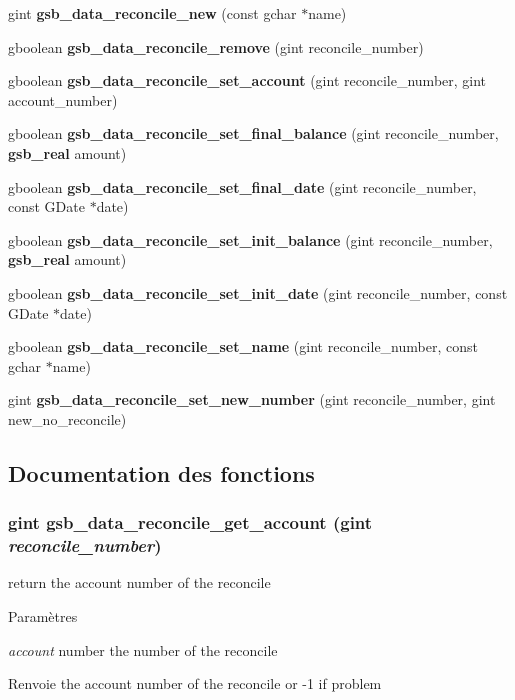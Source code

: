\begin{DoxyCompactItemize}
\item 
gint {\bf gsb\_\-data\_\-reconcile\_\-new} (const gchar $\ast$name)
\item 
gboolean {\bf gsb\_\-data\_\-reconcile\_\-remove} (gint reconcile\_\-number)
\item 
gboolean {\bf gsb\_\-data\_\-reconcile\_\-set\_\-account} (gint reconcile\_\-number, gint account\_\-number)
\item 
gboolean {\bf gsb\_\-data\_\-reconcile\_\-set\_\-final\_\-balance} (gint reconcile\_\-number, {\bf gsb\_\-real} amount)
\item 
gboolean {\bf gsb\_\-data\_\-reconcile\_\-set\_\-final\_\-date} (gint reconcile\_\-number, const GDate $\ast$date)
\item 
gboolean {\bf gsb\_\-data\_\-reconcile\_\-set\_\-init\_\-balance} (gint reconcile\_\-number, {\bf gsb\_\-real} amount)
\item 
gboolean {\bf gsb\_\-data\_\-reconcile\_\-set\_\-init\_\-date} (gint reconcile\_\-number, const GDate $\ast$date)
\item 
gboolean {\bf gsb\_\-data\_\-reconcile\_\-set\_\-name} (gint reconcile\_\-number, const gchar $\ast$name)
\item 
gint {\bf gsb\_\-data\_\-reconcile\_\-set\_\-new\_\-number} (gint reconcile\_\-number, gint new\_\-no\_\-reconcile)
\end{DoxyCompactItemize}


\subsection{Documentation des fonctions}
\subsubsection[{gsb\_\-data\_\-reconcile\_\-get\_\-account}]{\setlength{\rightskip}{0pt plus 5cm}gint gsb\_\-data\_\-reconcile\_\-get\_\-account (gint {\em reconcile\_\-number})}\label{gsb__data__reconcile_8h_a57f4a52c653f13e27564fc8ff2b4350b}
return the account number of the reconcile


\begin{DoxyParams}{Paramètres}
\item[{\em account}]number the number of the reconcile\end{DoxyParams}
\begin{DoxyReturn}{Renvoie}
the account number of the reconcile or -\/1 if problem 
\end{DoxyReturn}


